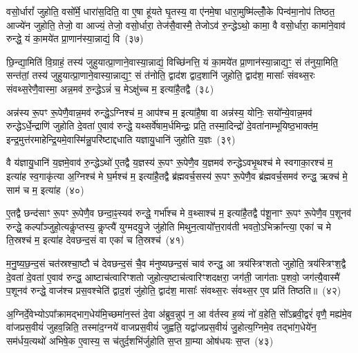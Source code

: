 {\anuvakamend[{अग्ने॒ प्रेह्यव॑ स्म दुहे॒ तां प्र॒जाप॑तेः सा॒क्षान्म॑नुष्यवि॒शमेक॑विꣳशतिश्च}]}%

वसो॒र्धारां᳚ जुहोति॒ वसो᳚र्मे॒ धारा॑स॒दिति॒ वा ए॒षा हू॑यते घृ॒तस्य॒ वा ए॑नमे॒षा धारा॒मुष्मि॑ल्लोँ॒के पिन्व॑मा॒नोप॑ तिष्ठत॒ आज्ये॑न जुहोति॒ तेजो॒ वा आज्यं॒ तेजो॒ वसो॒र्धारा॒ तेज॑सै॒वास्मै॒ तेजो\-ऽव॑ रु॒न्द्धे\-ऽथो॒ कामा॒ वै वसो॒र्धारा॒ कामा॑ने॒वाव॑ रुन्द्धे॒ यं का॒मये॑त प्रा॒णान॑स्या॒न्नाद्यं॒ वि~(३७)

छि॒न्द्या॒मिति॑ वि॒ग्राहं॒ तस्य॑ जुहुयात्प्रा॒णाने॒वास्या॒न्नाद्यं॒ विच्छि॑नत्ति॒ यं का॒मये॑त प्रा॒णान॑स्या॒न्नाद्य॒ꣳ॒ सं त॑नुया॒मिति॒ सन्त॑तां॒ तस्य॑ जुहुयात्प्रा॒णाने॒वास्या॒न्नाद्य॒ꣳ॒ सं त॑नोति॒ द्वाद॑श द्वाद॒शानि॑ जुहोति॒ द्वाद॑श॒ मासाः᳚ संवथ्स॒रः संवथ्स॒रेणै॒वास्मा॒ अन्न॒मव॑ रु॒न्द्धे\-ऽन्नं॑ च॒ मे\-ऽक्षु॑च्च म॒ इत्या॑है॒तद्वै~(३८)

अन्न॑स्य रू॒पꣳ रू॒पेणै॒वान्न॒मव॑ रुन्द्धे॒\-ऽग्निश्च॑ म॒ आप॑श्च म॒ इत्या॑है॒षा वा अन्न॑स्य॒ योनिः॒ सयो᳚न्ये॒वान्न॒मव॑ रुन्द्धे\-ऽर्धे॒न्द्राणि॑ जुहोति दे॒वता॑ ए॒वाव॑ रुन्द्धे॒ यथ्सर्वे॑षाम॒र्धमिन्द्रः॒ प्रति॒ तस्मा॒दिन्द्रो॑ दे॒वता॑नाम्भूयिष्ठ॒भाक्त॑म॒ इन्द्र॒मुत्त॑रमाहेन्द्रि॒यमे॒वास्मि॑न्नु॒परि॑ष्टाद्दधाति यज्ञायु॒धानि॑ जुहोति य॒ज्ञः~(३९)

वै य॑ज्ञायु॒धानि॑ य॒ज्ञमे॒वाव॑ रु॒न्द्धे\-ऽथो॑ ए॒तद्वै य॒ज्ञस्य॑ रू॒पꣳ रू॒पेणै॒व य॒ज्ञमव॑ रुन्द्धे\-ऽवभृ॒थश्च॑ मे स्वगाका॒रश्च॑ म॒ इत्या॑ह स्व॒गाकृ॑त्या अ॒ग्निश्च॑ मे घ॒र्मश्च॑ म॒ इत्या॑है॒तद्वै ब्र॑ह्मवर्च॒सस्य॑ रू॒पꣳ रू॒पेणै॒व ब्र॑ह्मवर्च॒समव॑ रुन्द्ध॒ ऋक्च॑ मे॒ साम॑ च म॒ इत्या॑ह~(४०)

ए॒तद्वै छन्द॑साꣳ रू॒पꣳ रू॒पेणै॒व छन्दा॒ꣴ॒स्यव॑ रुन्द्धे॒ गर्भा᳚श्च मे व॒थ्साश्च॑ म॒ इत्या॑है॒तद्वै प॑शू॒नाꣳ रू॒पꣳ रू॒पेणै॒व प॒शूनव॑ रुन्द्धे॒ कल्पा᳚ञ्जुहो॒त्यकॢ॑प्तस्य॒ कॢप्त्यै॑ युग्मदयु॒जे जु॑होति मिथुन॒त्वायो᳚त्त॒राव॑ती भवतो॒\-ऽभिक्रा᳚न्त्या॒ एका॑ च मे ति॒स्रश्च॑ म॒ इत्या॑ह देवछन्द॒सं वा एका॑ च ति॒स्रश्च॑~(४१)

म॒नु॒ष्य॒छ॒न्द॒सं चत॑स्रश्चा॒ष्टौ च॑ देवछन्द॒सं चै॒व म॑नुष्यछन्द॒सं चाव॑ रुन्द्ध॒ आ त्रय॑स्त्रिꣳशतो जुहोति॒ त्रय॑स्त्रिꣳश॒द्वै दे॒वता॑ दे॒वता॑ ए॒वाव॑ रुन्द्ध॒ आष्टाच॑त्वारिꣳशतो जुहोत्य॒ष्टाच॑त्वारिꣳशदक्षरा॒ जग॑ती॒ जाग॑ताः प॒शवो॒ जग॑त्यै॒वास्मै॑ प॒शूनव॑ रुन्द्धे॒ वाज॑श्च प्रस॒वश्चेति॑ द्वाद॒शं जु॑होति॒ द्वाद॑श॒ मासाः᳚ संवथ्स॒रः सं॑वथ्स॒र ए॒व प्रति॑ तिष्ठति॥~(४२)

{\anuvakamend[{वि वै य॒ज्ञः साम॑ च म॒ इत्या॑ह च ति॒स्रश्चैका॒न्नप॑ञ्चा॒शच्च॑}]}%

अ॒ग्निर्दे॒वेभ्यो\-ऽपा᳚क्रामद्भाग॒धेय॑मि॒च्छमा॑न॒स्तं दे॒वा अ॑ब्रुव॒न्नुप॑ न॒ आ व॑र्तस्व ह॒व्यं नो॑ व॒हेति॒ सो᳚\-ऽब्रवी॒द्वरं॑ वृणै॒ मह्य॑मे॒व वा॑जप्रस॒वीयं॑ जुहव॒न्निति॒ तस्मा॑द॒ग्नये॑ वाजप्रस॒वीयं॑ जुह्वति॒ यद्वा॑जप्रस॒वीयं॑ जु॒होत्य॒ग्निमे॒व तद्भा॑ग॒धेये॑न॒ सम॑र्धय॒त्यथो॑ अभिषे॒क ए॒वास्य॒ स च॑तुर्द॒शभि॑र्जुहोति स॒प्त ग्रा॒म्या ओष॑धयः स॒प्त~(४३)

